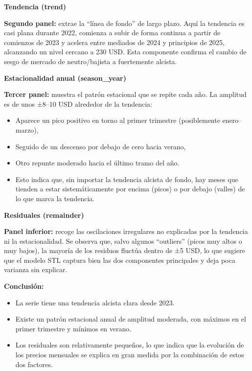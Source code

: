\documentclass[
  11pt,
]{book}
\begin{document}
\textbf{Tendencia (trend)}

\textbf{Segundo panel:} extrae la ``línea de fondo'' de largo plazo. Aquí la tendencia es casi plana durante 2022, comienza a subir de forma continua a partir de comienzos de 2023 y acelera entre mediados de 2024 y principios de 2025, alcanzando un nivel cercano a 230 USD. Esta componente confirma el cambio de sesgo de mercado de neutro/bajista a fuertemente alcista.

\textbf{Estacionalidad anual (season\_year)}

\textbf{Tercer panel:} muestra el patrón estacional que se repite cada año. La amplitud es de unos ±8--10 USD alrededor de la tendencia:

\begin{itemize}
\item
  Aparece un pico positivo en torno al primer trimestre (posiblemente enero--marzo),
\item
  Seguido de un descenso por debajo de cero hacia verano,
\item
  Otro repunte moderado hacia el último tramo del año.
\item
  Esto indica que, sin importar la tendencia alcista de fondo, hay meses que tienden a estar sistemáticamente por encima (picos) o por debajo (valles) de lo que marca la tendencia.
\end{itemize}

\textbf{Residuales (remainder)}

\textbf{Panel inferior:} recoge las oscilaciones irregulares no explicadas por la tendencia ni la estacionalidad. Se observa que, salvo algunos ``outliers'' (picos muy altos o muy bajos), la mayoría de los residuos fluctúa dentro de ±5 USD, lo que sugiere que el modelo STL captura bien las dos componentes principales y deja poca varianza sin explicar.

\textbf{Conclusión:}

\begin{itemize}
\item
  La serie tiene una tendencia alcista clara desde 2023.
\item
  Existe un patrón estacional anual de amplitud moderada, con máximos en el primer trimestre y mínimos en verano.
\item
  Los residuales son relativamente pequeños, lo que indica que la evolución de los precios mensuales se explica en gran medida por la combinación de estos dos factores.
\end{itemize}
\end{document}
